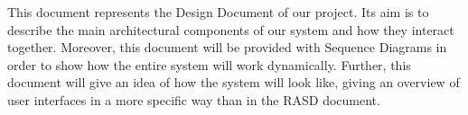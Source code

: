 This document represents the Design Document of our project. Its aim is to describe the main architectural components of our system and how they interact together. 
\newline
Moreover, this document will be provided with Sequence Diagrams in order to show how the entire system will work dynamically.
\newline
Further, this document will give an idea of how the system will look like, giving an overview of user interfaces in a more specific way than in the RASD document.